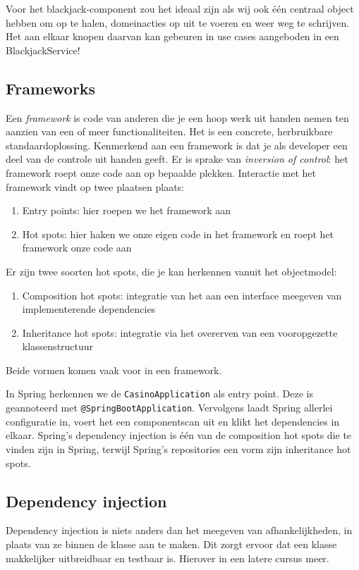 Voor het blackjack-component zou het ideaal zijn als wij ook één centraal object hebben 
om op te halen, domeinacties op uit te voeren en weer weg te schrijven. Het aan elkaar 
knopen daarvan kan gebeuren in use cases aangeboden in een BlackjackService!

\subsection{Frameworks}
Een \textit{framework} is code van anderen die je een hoop werk uit handen 
nemen ten aanzien van een of meer functionaliteiten. Het is een concrete, herbruikbare standaardoplossing.
Kenmerkend aan een framework is dat je als developer een deel van de controle 
uit handen geeft. Er is sprake van \textit{inversion of control}: het framework 
roept onze code aan op bepaalde plekken. Interactie met het framework vindt op twee plaatsen 
plaats:
\begin{enumerate}
    \item Entry points: hier roepen we het framework aan
    \item Hot spots: hier haken we onze eigen code in het framework en roept het framework onze code aan
\end{enumerate}

Er zijn twee soorten hot spots, die je kan herkennen vanuit het objectmodel:
\begin{enumerate}
    \item Composition hot spots: integratie van het aan een interface meegeven 
    van implementerende dependencies
    \item Inheritance hot spots: integratie via het overerven 
    van een vooropgezette klassenstructuur
\end{enumerate}

Beide vormen komen vaak voor in een framework.

In Spring herkennen we de \texttt{CasinoApplication} als entry point.
Deze is geannoteerd met \texttt{@SpringBootApplication}. Vervolgens laadt
Spring allerlei configuratie in, voert het een componentscan uit en klikt het dependencies in elkaar.
Spring's dependency injection is één van de composition hot spots die te vinden zijn in Spring,
terwijl Spring's repositories een vorm zijn inheritance hot spots.

\subsection{Dependency injection}
Dependency injection is niets anders dan het meegeven van afhankelijkheden,
in plaats van ze binnen de klasse aan te maken. Dit zorgt ervoor dat een klasse 
makkelijker uitbreidbaar en testbaar is. Hierover in een latere cursus meer.

